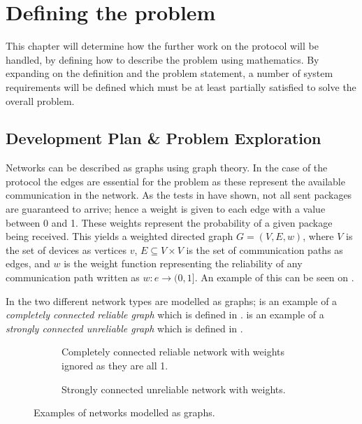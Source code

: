 \chapter{Defining the problem}
This chapter will determine how the further work on the protocol will be handled, by defining how to describe the problem using mathematics. 
By expanding on the definition and the problem statement, a number of system requirements will be defined which must be at least partially satisfied to solve the overall problem.

\section{Development Plan \& Problem Exploration}\label{chp:Problems}
Networks can be described as graphs using graph theory. 
In the case of the protocol the edges are essential for the problem as these represent the available communication in the network.
As the tests in  have shown, not all sent packages are guaranteed to arrive; hence a weight is given to each edge with a value between 0 and 1.
These weights represent the probability of a given package being received.
This yields a weighted directed graph $G = (V, E, w)$, where $V$ is the set of devices as vertices $v$, $E \subseteq V \times V$ is the set of communication paths as edges, and $w$ is the weight function representing the reliability of any communication path written as $w : e \rightarrow (0,1]$. 
An example of this can be seen on .

In  the two different network types are modelled as graphs; 
 is an example of a \emph{completely connected reliable graph} which is defined in .
 is an example of a \emph{strongly connected unreliable graph} which is defined in .

\begin{figure}[H]
    \footnotesize
    \begin{subfigure}{0.47\linewidth}
        \centering
        
        \caption{Completely connected reliable network with weights ignored as they are all 1.}
        \label{fig:ccrcnetworkgraph}
    \end{subfigure}\hfill
    \begin{subfigure}{0.47\linewidth}
        \centering
        
        \caption{Strongly connected unreliable network with weights.}
        \label{fig:network}
    \end{subfigure}
    \caption{Examples of networks modelled as graphs.}
    \label{fig:examplenetworkgraphs}
    \vspace{-20pt}
\end{figure}

